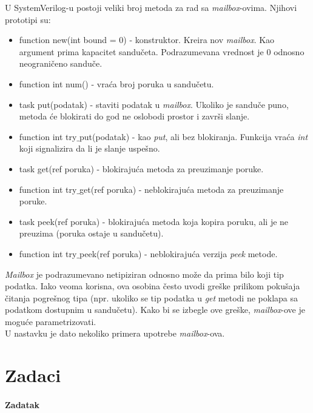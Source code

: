 U SystemVerilog-u postoji veliki broj metoda za rad sa \emph{mailbox}-ovima.
Njihovi prototipi su:
\begin{itemize}
\item function new(int bound = 0) - konstruktor. Kreira nov \emph{mailbox}. Kao
  argument prima kapacitet sandučeta. Podrazumevana vrednost je 0 odnosno
  neograničeno sanduče.
\item function int num() - vraća broj poruka u sandučetu.
\item task put(podatak) - staviti podatak u \emph{mailbox}. Ukoliko je sanduče puno,
  metoda će blokirati do god ne oslobodi prostor i završi slanje.
\item function int try\(\_\)put(podatak) - kao \emph{put}, ali bez
  blokiranja. Funkcija vraća \emph{int} koji signalizira da li je slanje
  uspešno.
\item task get(ref poruka) - blokirajuća metoda za preuzimanje poruke.
\item function int try\(\_\)get(ref poruka) - neblokirajuća metoda za
  preuzimanje poruke.
\item task peek(ref poruka) - blokirajuća metoda koja kopira poruku, ali je ne
  preuzima (poruka ostaje u sandučetu).
\item function int try\(\_\)peek(ref poruka) - neblokirajuća verzija \emph{peek}
  metode.
\end{itemize}

\emph{Mailbox} je podrazumevano netipiziran odnosno može da prima bilo koji tip
podatka.
Iako veoma korisna, ova osobina često uvodi greške prilikom pokušaja čitanja
pogrešnog tipa (npr. ukoliko se tip podatka u \emph{get} metodi ne poklapa sa
podatkom dostupnim u sandučetu).
Kako bi se izbegle ove greške, \emph{mailbox}-ove je moguće parametrizovati.\\

U nastavku je dato nekoliko primera upotrebe \emph{mailbox}-ova.




\section{Zadaci}

\paragraph{Zadatak}

